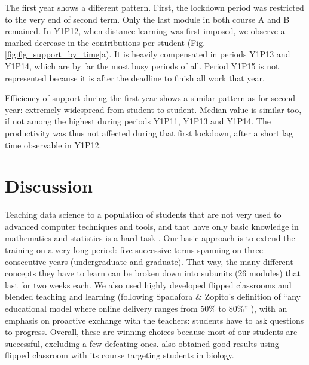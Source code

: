 \documentclass{aims}
\theoremstyle{definition}
\begin{document}
The first year shows a different pattern. First, the lockdown period was
restricted to the very end of second term. Only the last module in both
course A and B remained. In Y1P12, when distance learning was first
imposed, we observe a marked decrease in the contributions per student
(Fig. \ref {fig:fig_support_by_time}a). It is heavily compensated in
periods Y1P13 and Y1P14, which are by far the most busy periods of all.
Period Y1P15 is not represented because it is after the deadline to
finish all work that year.

Efficiency of support during the first year shows a similar pattern as
for second year: extremely widespread from student to student. Median
value is similar too, if not among the highest during periods Y1P11,
Y1P13 and Y1P14. The productivity was thus not affected during that
first lockdown, after a short lag time observable in Y1P12.

\hypertarget{discussion}{%
\section{Discussion}\label{discussion}}

Teaching data science to a population of students that are not very used
to advanced computer techniques and tools, and that have only basic
knowledge in mathematics and statistics is a hard task \cite{Sousa2018}.
Our basic approach is to extend the training on a very long period: five
successive terms spanning on three consecutive years (undergraduate and
graduate). That way, the many different concepts they have to learn can
be broken down into subunits (26 modules) that last for two weeks each.
We also used highly developed flipped classrooms and blended teaching
and learning (following Spadafora \& Zopito's definition of ``any
educational model where online delivery ranges from 50\% to 80\%''
\cite{Spadafora2018}), with an emphasis on proactive exchange with the
teachers: students have to ask questions to progress. Overall, these are
winning choices because most of our students are successful, excluding a
few defeating ones. \cite{Compeau2019} also obtained good results using
flipped classroom with its course targeting students in biology.
\end{document}
